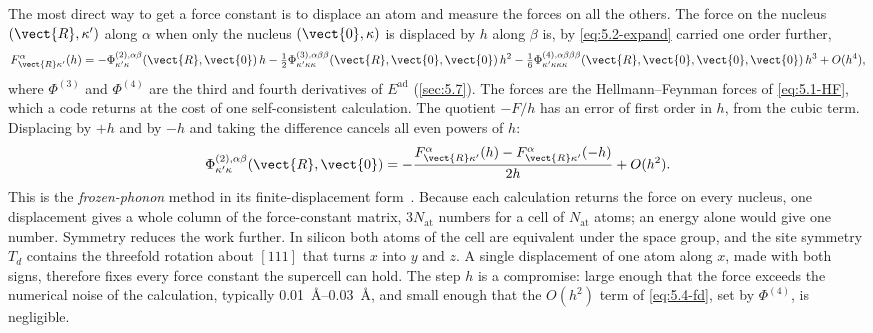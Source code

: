 The most direct way to get a force constant is to displace an atom and measure the forces on all the others. The force on the nucleus $(\vect{R},\kappa')$ along $\alpha$ when only the nucleus $(\vect{0},\kappa)$ is displaced by $h$ along $\beta$ is, by \cref{eq:5.2-expand} carried one order further,
\begin{equation*}
  F^\alpha_{\vect{R}\kappa'}(h) = -\Phi^{(2),\alpha\beta}_{\kappa'\kappa}(\vect{R},\vect{0})\,h - \tfrac12\Phi^{(3),\alpha\beta\beta}_{\kappa'\kappa\kappa}(\vect{R},\vect{0},\vect{0})\,h^2 - \tfrac16\Phi^{(4),\alpha\beta\beta\beta}_{\kappa'\kappa\kappa\kappa}(\vect{R},\vect{0},\vect{0},\vect{0})\,h^3 + O(h^4) ,
\end{equation*}
where $\Phi^{(3)}$ and $\Phi^{(4)}$ are the third and fourth derivatives of $E^{\mathrm{ad}}$ (\cref{sec:5.7}). The forces are the Hellmann--Feynman forces of \cref{eq:5.1-HF}, which a code returns at the cost of one self-consistent calculation. The quotient $-F/h$ has an error of first order in $h$, from the cubic term. Displacing by $+h$ and by $-h$ and taking the difference cancels all even powers of $h$:
\begin{equation}
  \Phi^{(2),\alpha\beta}_{\kappa'\kappa}(\vect{R},\vect{0}) = -\frac{F^\alpha_{\vect{R}\kappa'}(h) - F^\alpha_{\vect{R}\kappa'}(-h)}{2h} + O(h^2) .
  \label{eq:5.4-fd}
\end{equation}
This is the \emph{frozen-phonon} method in its finite-displacement form~\cite[Sect.~IV.B]{baroni2001phonons}. Because each calculation returns the force on every nucleus, one displacement gives a whole column of the force-constant matrix, $3N_{\mathrm{at}}$ numbers for a cell of $N_{\mathrm{at}}$ atoms; an energy alone would give one number. Symmetry reduces the work further. In silicon both atoms of the cell are equivalent under the space group, and the site symmetry $T_d$ contains the threefold rotation about $[111]$ that turns $x$ into $y$ and $z$. A single displacement of one atom along $x$, made with both signs, therefore fixes every force constant the supercell can hold. The step $h$ is a compromise: large enough that the force exceeds the numerical noise of the calculation, typically \SIrange{0.01}{0.03}{\angstrom}, and small enough that the $O(h^2)$ term of \cref{eq:5.4-fd}, set by $\Phi^{(4)}$, is negligible.


